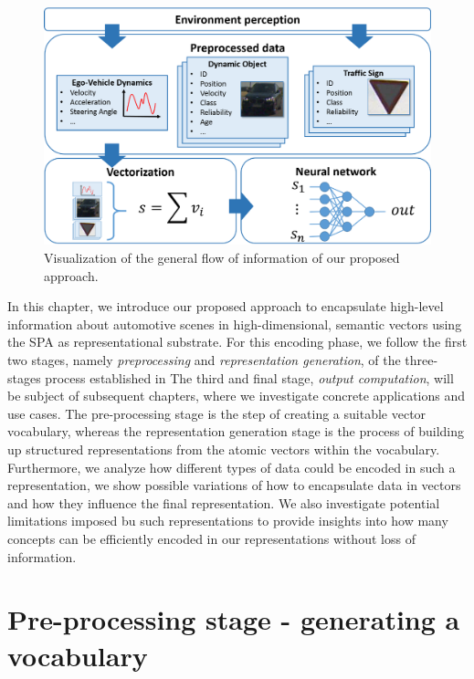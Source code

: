 \begin{figure}[t]
    \centering
    \includegraphics[width=0.8\linewidth]{imgs/system_overview_horizontal.eps}
    \caption{Visualization of the general flow of information of our proposed approach.}
    \label{fig:vectorization}
\end{figure}

In this chapter, we introduce our proposed approach to encapsulate high-level information about automotive scenes in high-dimensional, semantic vectors using the \ac{SPA} as representational substrate.
For this encoding phase, we follow the first two stages, namely \emph{preprocessing} and \emph{representation generation}, of the three-stages process established in \cite{Gallant2013} 
The third and final stage, \emph{output computation}, will be subject of subsequent chapters, where we investigate concrete applications and use cases.
The pre-processing stage is the step of creating a suitable vector vocabulary, whereas the representation generation stage is the process of building up structured representations from the atomic vectors within the vocabulary.
Furthermore, we analyze how different types of data could be encoded in such a representation, we show possible variations of how to encapsulate data in vectors and how they influence the final representation.
We also investigate potential limitations imposed bu such representations to provide insights into how many concepts can be efficiently encoded in our representations without loss of information.  


\section{Pre-processing stage - generating a vocabulary}%
\label{sec:preprocessing_stage_generating_a_vocabulary}

